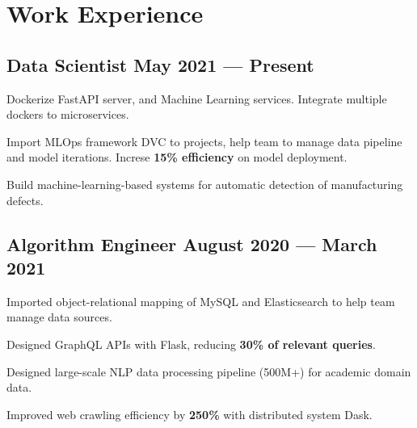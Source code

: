 \section{Work Experience}

\subsection*{Data Scientist \hfill May 2021 --- Present} 
    \begin{zitemize}
        \item Dockerize FastAPI server, and Machine Learning services. Integrate multiple dockers to microservices.
        \item Import MLOps framework DVC to projects, help team to manage data pipeline and model iterations. Increse \textbf{15\% efficiency} on model deployment.
        \item Build machine-learning-based systems for automatic detection of manufacturing defects.
    \end{zitemize}


\subsection*{Algorithm Engineer \hfill August 2020 --- March 2021} 
    \begin{zitemize}
        \item Imported object-relational mapping of MySQL and Elasticsearch to help team manage data sources.
        \item Designed GraphQL APIs with Flask, reducing \textbf{30\% of relevant queries}.
        \item Designed large-scale NLP data processing pipeline (500M+) for academic domain data.
        \item Improved web crawling efficiency by \textbf{250\%} with distributed system Dask.
    \end{zitemize}


